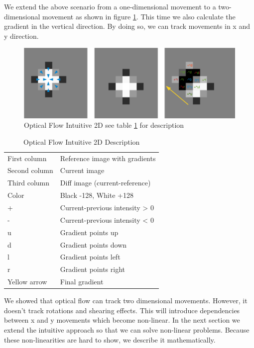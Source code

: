 \documentclass[11pt,a4paper,titlepage,oneside]{report}
\begin{document}
We extend the above scenario from a one-dimensional movement to a two-dimensional movement as shown in figure \ref{fig:optical_flow_2d}. This time we also calculate the gradient in the vertical direction. By doing so, we can track movements in x and y direction.

\begin{figure}[H]
  \includegraphics[width=1.0\textwidth]{img/optical_flow_2d.png}
  \caption{Optical Flow Intuitive 2D see table \ref{tab:optical_flow_2d} for description}
  \label{fig:optical_flow_2d}
\end{figure}

\begin{table}[H]
   \centering
   \begin{tabular}{l l}
       First column & Reference image with gradients\\
       Second column & Current image\\
       Third column & Diff image (current-reference)\\
       Color & Black -128, White +128\\
       + & Current-previous intensity > 0\\
       - & Current-previous intensity < 0\\
       u & Gradient points up\\
       d & Gradient points down\\
       l & Gradient points left\\
       r & Gradient points right\\
       Yellow arrow & Final gradient
  \end{tabular}
   \caption{Optical Flow Intuitive 2D Description}
  \label{tab:optical_flow_2d}
\end{table}

We showed that optical flow can track two dimensional movements. However, it doesn't track rotations and shearing effects. This will introduce dependencies between x and y movements which become non-linear. In the next section we extend the intuitive approach so that we can solve non-linear problems. Because these non-linearities are hard to show, we describe it mathematically.
\end{document}
